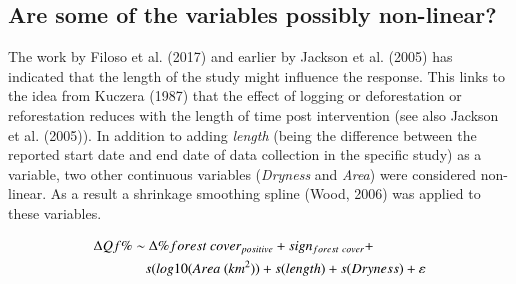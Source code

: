 \documentclass[]{elsarticle} %
\begin{document}
\hypertarget{are-some-of-the-variables-possibly-non-linear}{%
\subsection{Are some of the variables possibly non-linear?}\label{are-some-of-the-variables-possibly-non-linear}}

The work by Filoso et al. (2017) and earlier by Jackson et al. (2005) has indicated that the length of the study might influence the response. This links to the idea from Kuczera (1987) that the effect of logging or deforestation or reforestation reduces with the length of time post intervention (see also Jackson et al. (2005)). In addition to adding \emph{length} (being the difference between the reported start date and end date of data collection in the specific study) as a variable, two other continuous variables (\emph{Dryness} and \emph{Area}) were considered non-linear. As a result a shrinkage smoothing spline (Wood, 2006) was applied to these variables.

\begin{align}
\Delta Qf \% \sim &~ \Delta \% forest~cover_{positive} + sign_{forest~cover} + \notag \\ & s(log10(Area ~(km^2)) + s(length) + s(Dryness) + \varepsilon \label{eq:eq7}
\end{align}
\end{document}
